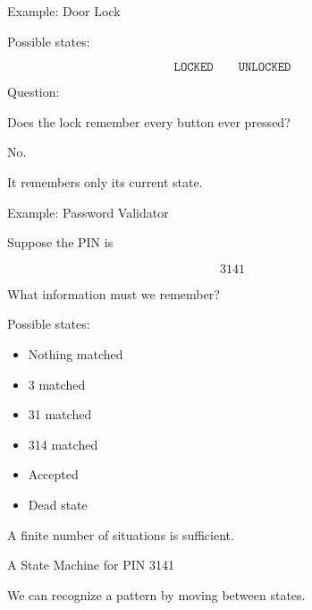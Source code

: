 \documentclass[10pt,aspectratio=169]{beamer}
\begin{document}
\begin{frame}{Example: Door Lock}

Possible states:

\[
\texttt{LOCKED}
\qquad
\texttt{UNLOCKED}
\]

\vspace{2em}

Question:

Does the lock remember every button ever pressed?

\pause

No.

It remembers only its current state.

\end{frame}

\begin{frame}{Example: Password Validator}

Suppose the PIN is

\[
3141
\]

What information must we remember?

\pause

Possible states:

\begin{itemize}
\item Nothing matched
\item 3 matched
\item 31 matched
\item 314 matched
\item Accepted
\item Dead state
\end{itemize}

\pause

A finite number of situations is sufficient.

\end{frame}

\begin{frame}{A State Machine for PIN 3141}

\begin{center}


\end{center}

We can recognize a pattern by moving between states.

\end{frame}
\end{document}
